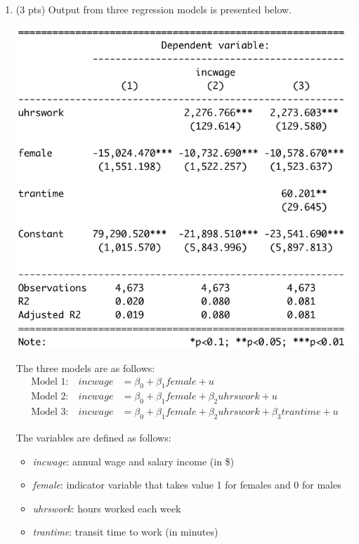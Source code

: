 \documentclass{./../../Latex/handout}
\begin{document}
\begin{enumerate}
\item (3 pts) 
Output from three regression models is presented below. 
\begin{center}
\includegraphics[scale=0.55]{reg.png} 	
\end{center}

The three models are as follows: 
\begin{align*}
	 \text{Model 1:} \quad incwage &=\beta_0 + \beta_1  female + u \\
	 \text{Model 2:} \quad incwage &=\beta_0 + \beta_1  female + \beta_2 uhrswork + u \\
	 \text{Model 3:} \quad incwage &=\beta_0 + \beta_1  female + \beta_2 uhrswork + \beta_3 trantime + u 
\end{align*}

The variables are defined as follows:
\begin{itemize}
  \item \textit{incwage}: annual wage and salary income (in \$)
  \item \textit{female}: indicator variable that takes value 1 for females and 0 for males
  \item \textit{uhrswork}: hours worked each week
  \item \textit{trantime}: transit time to work (in minutes) \\
\end{itemize}


\end{enumerate}
\end{document}
